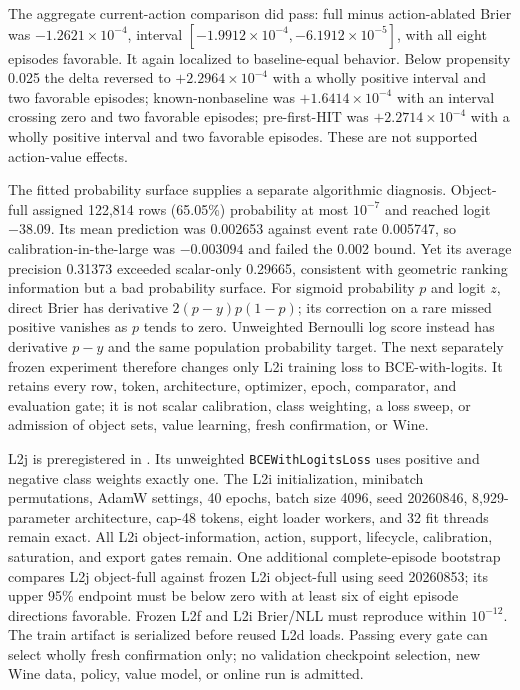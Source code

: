 \documentclass[11pt]{article}
\begin{document}
The aggregate current-action comparison did pass: full minus action-ablated
Brier was $-1.2621\times10^{-4}$, interval
$[-1.9912\times10^{-4},-6.1912\times10^{-5}]$, with all eight episodes
favorable.  It again localized to baseline-equal behavior.  Below propensity
0.025 the delta reversed to $+2.2964\times10^{-4}$ with a wholly positive
interval and two favorable episodes; known-nonbaseline was
$+1.6414\times10^{-4}$ with an interval crossing zero and two favorable
episodes; pre-first-HIT was $+2.2714\times10^{-4}$ with a wholly positive
interval and two favorable episodes.  These are not supported action-value
effects.

The fitted probability surface supplies a separate algorithmic diagnosis.
Object-full assigned 122,814 rows (65.05\%) probability at most $10^{-7}$ and
reached logit $-38.09$.  Its mean prediction was 0.002653 against event rate
0.005747, so calibration-in-the-large was $-0.003094$ and failed the 0.002
bound.  Yet its average precision 0.31373 exceeded scalar-only 0.29665,
consistent with geometric ranking information but a bad probability surface.
For sigmoid probability $p$ and logit $z$, direct Brier has derivative
$2(p-y)p(1-p)$; its correction on a rare missed positive vanishes as $p$ tends
to zero.  Unweighted Bernoulli log score instead has derivative $p-y$ and the
same population probability target.  The next separately frozen experiment
therefore changes only L2i training loss to BCE-with-logits.  It retains every
row, token, architecture, optimizer, epoch, comparator, and evaluation gate;
it is not scalar calibration, class weighting, a loss sweep, or admission of
object sets, value learning, fresh confirmation, or Wine.

L2j is preregistered in
.  Its unweighted
\texttt{BCEWithLogitsLoss} uses positive and negative class weights exactly
one.  The L2i initialization, minibatch permutations, AdamW settings, 40
epochs, batch size 4096, seed 20260846, 8,929-parameter architecture, cap-48
tokens, eight loader workers, and 32 fit threads remain exact.  All L2i
object-information, action, support, lifecycle, calibration, saturation, and
export gates remain.  One additional complete-episode bootstrap compares L2j
object-full against frozen L2i object-full using seed 20260853; its upper 95\%
endpoint must be below zero with at least six of eight episode directions
favorable.  Frozen L2f and L2i Brier/NLL must reproduce within $10^{-12}$.
The train artifact is serialized before reused L2d loads.  Passing every gate
can select wholly fresh confirmation only; no validation checkpoint selection,
new Wine data, policy, value model, or online run is admitted.
\end{document}
